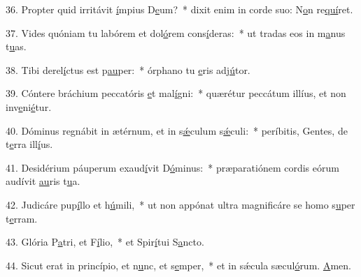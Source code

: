 36. Propter quid irritávit \uline{í}mpius D\uline{e}um?~* dixit enim in corde suo: N\uline{o}n re\uline{quí}ret.\par 
37. Vides quóniam tu labórem et dol\uline{ó}rem cons\uline{í}deras:~* ut tradas eos in m\uline{a}nus t\uline{u}as.\par 
38. Tibi derel\uline{í}ctus est p\uline{au}per:~* órphano tu \uline{e}ris adj\uline{ú}tor.\par 
39. Cóntere bráchium peccatóris \uline{e}t mal\uline{í}gni:~* quærétur peccátum illíus, et non inv\uline{e}ni\uline{é}tur.\par 
40. Dóminus regnábit in ætérnum, et in s\uline{ǽ}culum s\uline{ǽ}culi:~* períbitis, Gentes, de t\uline{e}rra ill\uline{í}us.\par 
41. Desidérium páuperum exaud\uline{í}vit D\uline{ó}minus:~* præparatiónem cordis eórum audívit \uline{au}ris t\uline{u}a.\par 
42. Judicáre pup\uline{í}llo et h\uline{ú}mili,~* ut non appónat ultra magnificáre se homo s\uline{u}per t\uline{e}rram.\par 
43. Glória P\uline{a}tri, et F\uline{í}lio,~* et Spir\uline{í}tui S\uline{a}ncto.\par 
44. Sicut erat in princípio, et n\uline{u}nc, et s\uline{e}mper,~* et in sǽcula sæcul\uline{ó}rum. \uline{A}men.\par 
